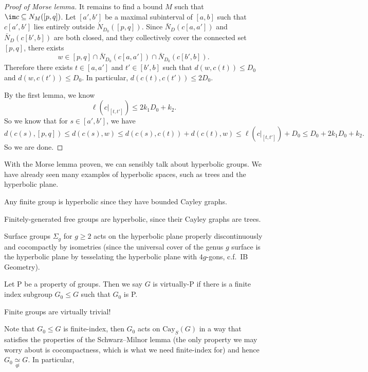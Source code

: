 \documentclass[a4paper]{article}
\newcommand\Cay{\mathrm{Cay}}
\newcommand{\qi}{\underset{qi}{\simeq}}
\begin{document}
\begin{proof}[Proof of Morse lemma]
  It remains to find a bound $M$ such that $\im c \subseteq N_M([p, q])$. Let $[a', b']$ be a maximal subinterval of $[a, b]$ such that $c[a', b']$ lies entirely outside $\mathring{N}_{D_0}([p, q])$. Since $\bar{N}_D(c[a, a'])$ and $\bar{N}_D(c[b', b])$ are both closed, and they collectively cover the connected set $[p, q]$, there exists
  \[
    w \in [p, q] \cap \bar{N}_{D_0}(c[a, a']) \cap \bar{N}_{D_0}(c[b', b]).
  \]
  Therefore there exists $t \in [a, a']$ and $t' \in [b', b]$ such that $d(w, c(t)) \leq D_0$ and $d(w, c(t')) \leq D_0$. In particular, $d(c(t), c(t')) \leq 2 D_0$.

  By the first lemma, we know
  \[
    \ell(c|_{[t, t']}) \leq 2k_1 D_0 + k_2.
  \]
  So we know that for $s \in [a', b']$, we have
  \[
    d(c(s), [p, q]) \leq d(c(s), w) \leq d(c(s), c(t)) + d(c(t), w) \leq \ell(c|_{[t, t']}) + D_0 \leq D_0 + 2k_1 D_0 + k_2.
  \]
  So we are done.
\end{proof}

With the Morse lemma proven, we can sensibly talk about hyperbolic groups. We have already seen many examples of hyperbolic spaces, such as trees and the hyperbolic plane.

\begin{eg}
  Any finite group is hyperbolic since they have bounded Cayley graphs.
\end{eg}

\begin{eg}
  Finitely-generated free groups are hyperbolic, since their Cayley graphs are trees.
\end{eg}

\begin{eg}
  Surface groups $\Sigma_g$ for $g \geq 2$ acts on the hyperbolic plane properly discontinuously and cocompactly by isometries (since the universal cover of the genus $g$ surface is the hyperbolic plane by tesselating the hyperbolic plane with $4g$-gons, c.f.\ IB Geometry).
\end{eg}

\begin{defi}[virtually-P]
  Let P be a property of groups. Then we say $G$ is virtually-P if there is a finite index subgroup $G_0 \leq G$ such that $G_0$ is P.
\end{defi}

\begin{eg}
  Finite groups are virtually trivial!
\end{eg}

Note that $G_0 \leq G$ is finite-index, then $G_0$ acts on $\Cay_S(G)$ in a way that satisfies the properties of the Schwarz--Milnor lemma (the only property we may worry about is cocompactness, which is what we need finite-index for) and hence $G_0 \qi G$. In particular,
\end{document}
